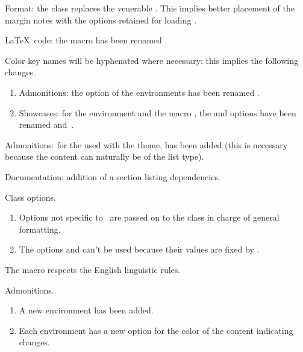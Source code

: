 \begin{tdocbreak}[version = 1.7.0, date = 2024-12-04]
	\item Format: the  class replaces the venerable . This implies better placement of the margin notes with the options retained for loading .

	\item \LaTeX\ code: the macro  has been renamed .

	\item Color key names will be hyphenated where necessary: this implies the following changes.
	\begin{enumerate}
		\item Admonitions: the  option of the environments has been renamed .

		\item Showcases: for the environment  and the macro , the  and   options have been renamed  and \,.
	\end{enumerate}
\end{tdocbreak}


\begin{tdocfix}
	\item Admonitions: for the  used with the  theme,  has been added (this is necessary because the content can naturally be of the list type).
\end{tdocfix}


\begin{tdocnew}
	\item Documentation: addition of a section listing dependencies.

	\item Class options.
	\begin{enumerate}
		\item Options not specific to \thisproj\ are passed on to the class in charge of general formatting.

		\item The  options  and  can't be used because their values are fixed by \thisproj.
	\end{enumerate}

	\item The macro  respects the English linguistic rules.

	\item Admonitions.
	\begin{enumerate}
		\item A new environment  has been added.

		\item Each environment has a new option  for the color of the content indicating changes.
	\end{enumerate}
\end{tdocnew}


